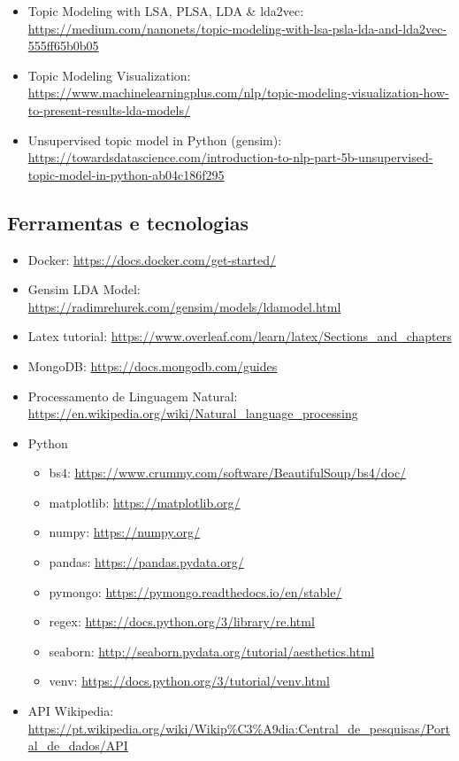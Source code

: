\begin{itemize}
    \item Topic Modeling with LSA, PLSA, LDA \& lda2vec: \url{https://medium.com/nanonets/topic-modeling-with-lsa-psla-lda-and-lda2vec-555ff65b0b05}
    \item Topic Modeling Visualization: \url{https://www.machinelearningplus.com/nlp/topic-modeling-visualization-how-to-present-results-lda-models/}
    \item Unsupervised topic model in Python (gensim): \url{https://towardsdatascience.com/introduction-to-nlp-part-5b-unsupervised-topic-model-in-python-ab04c186f295}
\end{itemize}

\subsection{Ferramentas e tecnologias}

\begin{itemize}
    \item Docker: \url{https://docs.docker.com/get-started/}
    \item Gensim LDA Model: \url{https://radimrehurek.com/gensim/models/ldamodel.html}
    \item Latex tutorial: \url{https://www.overleaf.com/learn/latex/Sections\_and\_chapters}
    \item MongoDB: \url{https://docs.mongodb.com/guides}
    \item Processamento de Linguagem Natural: \url{https://en.wikipedia.org/wiki/Natural_language_processing}
    \item Python
    \begin{itemize}
        \item bs4: \url{https://www.crummy.com/software/BeautifulSoup/bs4/doc/}
        \item matplotlib: \url{https://matplotlib.org/}
        \item numpy: \url{https://numpy.org/}
        \item pandas: \url{https://pandas.pydata.org/}
        \item pymongo: \url{https://pymongo.readthedocs.io/en/stable/}
        \item regex: \url{https://docs.python.org/3/library/re.html}
        \item seaborn: \url{http://seaborn.pydata.org/tutorial/aesthetics.html}
        \item venv: \url{https://docs.python.org/3/tutorial/venv.html}
    \end{itemize}
    \item API Wikipedia: \url{https://pt.wikipedia.org/wiki/Wikip%C3%A9dia:Central_de_pesquisas/Portal_de_dados/API}
\end{itemize}